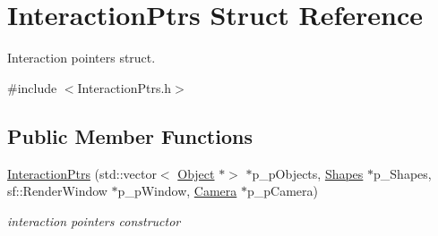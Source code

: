 \hypertarget{struct_interaction_ptrs}{}\section{Interaction\+Ptrs Struct Reference}
\label{struct_interaction_ptrs}


Interaction pointers struct.  




{\ttfamily \#include $<$Interaction\+Ptrs.\+h$>$}

\subsection*{Public Member Functions}
\begin{DoxyCompactItemize}
\item 
\mbox{\label{struct_interaction_ptrs_a508c3b51f098bdf4aee1379ecf4d0c6f}} 
\hyperlink{struct_interaction_ptrs_a508c3b51f098bdf4aee1379ecf4d0c6f}{Interaction\+Ptrs} (std\+::vector$<$ \hyperlink{class_object}{Object} $\ast$$>$ $\ast$p\+\_\+p\+Objects, \hyperlink{class_shapes}{Shapes} $\ast$p\+\_\+\+Shapes, sf\+::\+Render\+Window $\ast$p\+\_\+p\+Window, \hyperlink{class_camera}{Camera} $\ast$p\+\_\+p\+Camera)
\begin{DoxyCompactList}\small\item\em interaction pointers constructor \end{DoxyCompactList}\end{DoxyCompactItemize}
